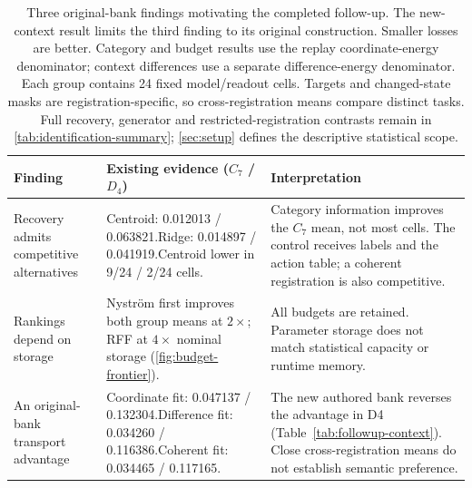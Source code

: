 \begin{table}[t]
\centering\small
\setlength{\tabcolsep}{4pt}
\renewcommand{\arraystretch}{1.10}
\begin{tabular}{@{}p{}p{}p{}@{}}
\toprule
Finding & Existing evidence ($C_7$ / $D_4$) & Interpretation \\
\midrule
Recovery admits competitive alternatives & Centroid: 0.012013 / 0.063821.\newline Ridge: 0.014897 / 0.041919.\newline Centroid lower in 9/24 / 2/24 cells. & Category information improves the $C_7$ mean, not most cells. The control receives labels and the action table; a coherent registration is also competitive. \\
\addlinespace[3pt]
Rankings depend on storage & Nystr\"om first improves both group means at $2\times$; RFF at $4\times$ nominal storage (\cref{fig:budget-frontier}). & All budgets are retained. Parameter storage does not match statistical capacity or runtime memory. \\
\addlinespace[3pt]
An original-bank transport advantage & Coordinate fit: 0.047137 / 0.132304.\newline Difference fit: 0.034260 / 0.116386.\newline Coherent fit: 0.034465 / 0.117165. & The new authored bank reverses the advantage in D4 (Table~\ref{tab:followup-context}). Close cross-registration means do not establish semantic preference. \\
\bottomrule
\end{tabular}
\caption{Three original-bank findings motivating the completed follow-up. The new-context result limits the third finding to its original construction. Smaller losses are better. Category and budget results use the replay coordinate-energy denominator; context differences use a separate difference-energy denominator. Each group contains 24 fixed model/readout cells. Targets and changed-state masks are registration-specific, so cross-registration means compare distinct tasks. Full recovery, generator and restricted-registration contrasts remain in \cref{tab:identification-summary}; \cref{sec:setup} defines the descriptive statistical scope.}
\label{tab:main-findings}
\end{table}
